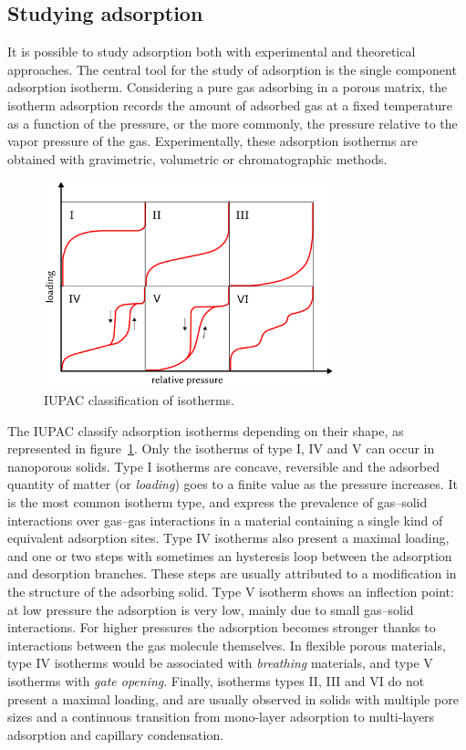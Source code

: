 \documentclass[thesis]{subfiles}
\begin{document}
\subsection{Studying adsorption}

It is possible to study adsorption both with experimental and theoretical
approaches. The central tool for the study of adsorption is the single component
adsorption isotherm. Considering a pure gas adsorbing in a porous matrix, the
isotherm adsorption records the amount of adsorbed gas at a fixed temperature as
a function of the pressure, or the more commonly, the pressure relative to the
vapor pressure of the gas. Experimentally, these adsorption isotherms are
obtained with gravimetric, volumetric or chromatographic
methods\cite{Ruthven1984, Yang1987}.

\begin{figure}[htb]
    \centering
    \includegraphics[width=0.75\textwidth]{figures/images/iupac-isotherms}
    \caption{IUPAC classification of isotherms.}
    \label{fig:iupac-isotherms}
\end{figure}

The IUPAC classify adsorption isotherms depending on their shape, as represented
in figure~\ref{fig:iupac-isotherms}\cite{Sing1985}. Only the isotherms of type
I, IV and V can occur in nanoporous solids. Type I isotherms are concave,
reversible and the adsorbed quantity of matter (or \emph{loading}) goes to a
finite value as the pressure increases. It is the most common isotherm type, and
express the prevalence of gas--solid interactions over gas--gas interactions in
a material containing a single kind of equivalent adsorption sites. Type IV
isotherms also present a maximal loading, and one or two steps with sometimes an
hysteresis loop between the adsorption and desorption branches. These steps are
usually attributed to a modification in the structure of the adsorbing
solid\cite{Karge1989}. Type V isotherm shows an inflection point: at low pressure
the adsorption is very low, mainly due to small gas--solid interactions. For
higher pressures the adsorption becomes stronger thanks to interactions between
the gas molecule themselves. In flexible porous materials, type IV isotherms
would be associated with \emph{breathing} materials, and type V isotherms with
\emph{gate opening}. Finally, isotherms types II, III and VI do not present a
maximal loading, and are usually observed in solids with multiple pore sizes and
a continuous transition from mono-layer adsorption to multi-layers adsorption and
capillary condensation.
\end{document}
